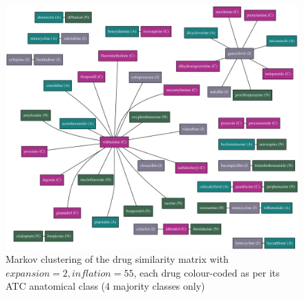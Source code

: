 \documentclass[12pt,a4paper,twoside,openright]{report}
\begin{document}
\begin{landscape}
	\begin{figure}[!htb]
		\centering
		\includegraphics[height=\textwidth]{drug-cluster-3.eps}
		\caption{Markov clustering of the drug similarity matrix with $\mathit{expansion}=2, \mathit{inflation}=55$, each drug colour-coded as per its ATC anatomical class (4 majority classes only)}
		\label{fig:drug-cluster-3}
	\end{figure}
	
\end{landscape}
\end{document}
